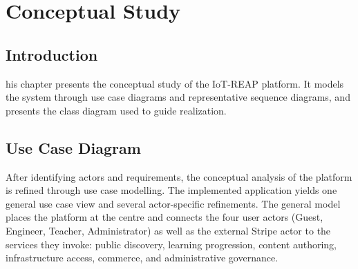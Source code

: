 %


\chapter{Conceptual Study}
\label{chap:conceptual_study}
\setcounter{section}{0}

\section*{Introduction}

his chapter presents the conceptual study of the IoT-REAP platform.
It models the system through use case diagrams and representative sequence
diagrams, and presents the class diagram used to guide realization.

\section{Use Case Diagram}
\label{sec:usecase}

After identifying actors and requirements, the conceptual analysis of the
platform is refined through use case modelling. The implemented application
yields one general use case view and several actor-specific refinements. The
general model places the platform at the centre and connects the four user
actors (Guest, Engineer, Teacher, Administrator) as well as the external Stripe
actor {\footnotesize\cite{stripe-docs}} to the services they invoke: public discovery,
learning progression, content authoring, infrastructure access, commerce, and
administrative governance.

